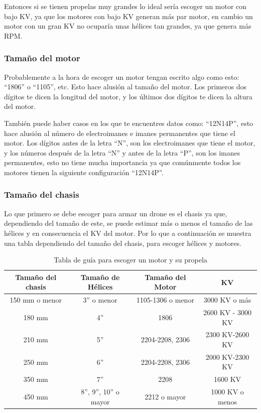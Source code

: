 \documentclass[pdflatex,sn-mathphys-num]{sn-jnl}%
\begin{document}
Entonces si se tienen propelas muy grandes lo ideal sería escoger un motor con bajo KV, ya que los motores con bajo KV generan más par motor, en cambio un motor con un gran KV no ocuparía unas hélices tan grandes, ya que genera más RPM.

\subsubsection{Tamaño del motor}

Probablemente a la hora de escoger un motor tengan escrito algo como esto: ``1806'' o ``1105'', etc. Esto hace alusión al tamaño del motor. Los primeros dos dígitos te dicen la longitud del motor, y los últimos dos dígitos te dicen la altura del motor.

También puede haber casos en los que te encuentres datos como: ``12N14P'', esto hace alusión al número de electroimanes e imanes permanentes que tiene el motor. Los dígitos antes de la letra ``N'', son los electroimanes que tiene el motor, y los números después de la letra ``N'' y antes de la letra ``P'', son los imanes permanentes, esto no tiene mucha importancia ya que comúnmente todos los motores tienen la siguiente configuración ``12N14P''.

\subsubsection{Tamaño del chasis}

Lo que primero se debe escoger para armar un drone es el chasis ya que, dependiendo del tamaño de este, se puede estimar más o menos el tamaño de las hélices y en consecuencia el KV del motor. Por lo que a continuación se muestra una tabla dependiendo del tamaño del chasis, para escoger hélices y motores.

\begin{table}[!h]
\centering
\caption{Tabla de guía para escoger un motor y su propela}
\label{tab:motor_guide}
\begin{tabular}{|c|c|c|c|}
\hline
\textbf{Tamaño del chasis} & \textbf{Tamaño de Hélices} & \textbf{Tamaño del Motor} & \textbf{KV} \\
\hline
150 mm o menor & 3'' o menor & 1105-1306 o menor & 3000 KV o más \\
\hline
180 mm & 4'' & 1806 & 2600 KV - 3000 KV \\
\hline
210 mm & 5'' & 2204-2208, 2306 & 2300 KV-2600 KV \\
\hline
250 mm & 6'' & 2204-2208, 2306 & 2000 KV-2300 KV \\
\hline
350 mm & 7'' & 2208 & 1600 KV \\
\hline
450 mm & 8'', 9'', 10'' o mayor & 2212 o mayor & 1000 KV o menos \\
\hline
\end{tabular}
\end{table}
\end{document}
